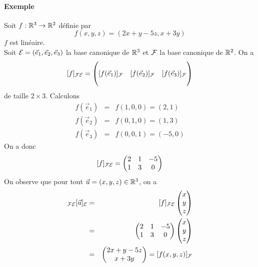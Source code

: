 \paragraph{Exemple} Soit $f: \mathbb{R}^3 \rightarrow \mathbb{R}^2$ définie par
$$f(x, y, z) = (2x + y - 5z ,  x + 3y)$$
$f$ est linéaire. \\
Soit $\mathcal{E} = (\vec{e}_1, \vec{e}_2, \vec{e}_3)$ la base canonique de $\mathbb{R}^3$ et $\mathcal{F}$ la base canonique de $\mathbb{R}^2$. On a
$$[f]_{\mathcal{F} \mathcal{E}} = \begin{pmatrix} \\ [f(\vec{e}_1)]_{\mathcal{F}} & [f(\vec{e}_2)]_{\mathcal{F}} & [f(\vec{e}_3)]_{\mathcal{F}} \\ \\ \end{pmatrix}$$ de taille $2 \times 3$. Calculons
\begin{eqnarray*}
  f(\vec{e}_1) &=& f(1, 0, 0) = (2, 1) \\
  f(\vec{e}_2) &=& f(0, 1, 0) = (1, 3) \\
  f(\vec{e}_3) &=& f(0, 0, 1) = (-5, 0) 
\end{eqnarray*}
On a donc
$$[f]_{\mathcal{F} \mathcal{E}}
  =
  \begin{pmatrix}
    2 & 1 & -5 \\
    1 & 3 & 0
  \end{pmatrix}$$
On observe que pour tout $\vec{u} = (x, y, z) \in \mathbb{R}^3$, on a
\begin{eqnarray*}
  [f]_{\cF \cE}[\vec{u}]_\cE 
  &=& [f]_{\cF \cE} \begin{pmatrix} x \\ y \\ z \end{pmatrix} \\
  &=&
    \begin{pmatrix}
      2 & 1 & -5 \\
      1 & 3 & 0
    \end{pmatrix}
    \begin{pmatrix} x \\ y \\ z \end{pmatrix} \\
  &=&
    \begin{pmatrix} 
      2x + y -5 z \\ 
      x + 3y
    \end{pmatrix}
  = [f(x, y, z)]_{\cF}
\end{eqnarray*}

